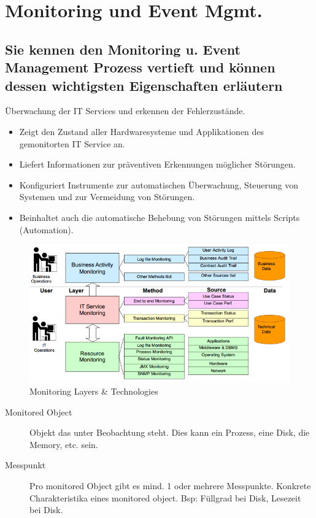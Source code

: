 \chapter{Monitoring und Event Mgmt.}
\label{sec:monitoring}

\section{Sie kennen den Monitoring u. Event Management Prozess vertieft und können dessen wichtigsten Eigenschaften erläutern}

Überwachung der IT Services und erkennen der Fehlerzustände. 

\begin{itemize}
	\item Zeigt den Zustand aller Hardwaresysteme und Applikationen des gemonitorten IT Service an.
	\item Liefert Informationen zur präventiven Erkennungen möglicher Störungen.
	\item Konfiguriert Instrumente zur automatischen Überwachung, Steuerung von Systemen und zur Vermeidung von Störungen.
	\item Beinhaltet auch die automatische Behebung von Störungen mittels Scripts (Automation).
\end{itemize}

\begin{figure}[h!]
\centering
\includegraphics[width=0.7\linewidth]{fig/itil-monitoring-layers}
\caption{Monitoring Layers \& Technologies}
\label{fig:itil-monitoring-layers}
\end{figure}

\begin{description}
	\item[Monitored Object] Objekt das unter Beobachtung steht. Dies kann ein Prozess, eine Disk, die Memory, etc. sein.
	\item[Messpunkt] Pro monitored Object gibt es mind. 1 oder mehrere Messpunkte. Konkrete Charakteristika eines monitored object. Bsp: Füllgrad bei Disk, Lesezeit bei Disk.
\end{description}

